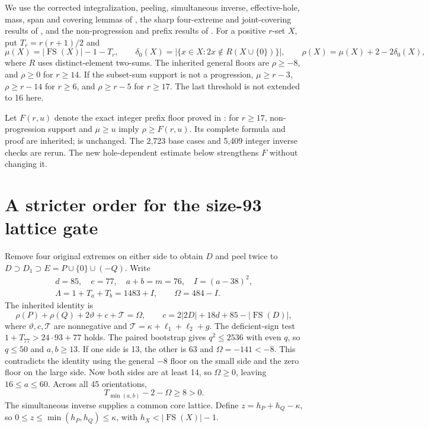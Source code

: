 \documentclass[11pt,a4paper]{article}
\newcommand{\FS}{\operatorname{FS}}
\newcommand{\T}{\mathcal T}
\begin{document}
We use the corrected integralization, peeling, simultaneous inverse,
effective-hole, mass, span and covering lemmas of \cite{foundation},
the sharp four-extreme and joint-covering results of \cite{overlap},
and the non-progression and prefix results of \cite{sharp,previous}.
For a positive $r$-set $X$, put $T_r=r(r+1)/2$ and
\[
 \mu(X)=|\FS(X)|-1-T_r,\qquad
 \delta_0(X)=|\{x\in X:2x\notin R(X\cup\{0\})\}|,\qquad
 \rho(X)=\mu(X)+2-2\delta_0(X),
\]
where $R$ uses distinct-element two-sums. The inherited general floors
are $\rho\ge-8$, and $\rho\ge0$ for $r\ge14$.
If the subset-sum support is not a progression, $\mu\ge r-3$,
$\rho\ge r-14$ for $r\ge6$, and $\rho\ge r-5$ for $r\ge17$.
The last threshold is not extended to 16 here.

Let $F(r,u)$ denote the exact integer prefix floor proved in
\cite{previous}: for $r\ge17$, non-progression support and $\mu\ge u$
imply $\rho\ge F(r,u)$. Its complete formula and proof are inherited;
 is unchanged. The 2,723 base cases
and 5,409 integer inverse checks are rerun. The new hole-dependent
estimate below strengthens $F$ without changing it.

\section{A stricter order for the size-93 lattice gate}
Remove four original extremes on either side to obtain $D$ and peel
twice to $D\supset D_1\supset E=P\cup\{0\}\cup(-Q)$. Write
\begin{gather*}
 d=85,\quad e=77,\quad a+b=m=76,\quad I=(a-38)^2,\\
 \Lambda=1+T_a+T_b=1483+I,\qquad \Omega=484-I.
\end{gather*}
The inherited identity is
\[
 \rho(P)+\rho(Q)+2\vartheta+c+\T=\Omega,
 \qquad c=2|2D|+18d+85-|\FS(D)|,
\]
where $\vartheta,c,\T$ are nonnegative and
$\T=\kappa+\ell_1+\ell_2+g$.
The deficient-sign test $1+T_{77}>24\cdot93+77$ holds.
The paired bootstrap gives $q^2\le2536$ with even $q$, so $q\le50$
and $a,b\ge13$. If one side is 13, the other is 63 and
$\Omega=-141<-8$. This contradicts the identity using the general
$-8$ floor on the small side and the zero floor on the large side.
Now both sides are at least 14, so $\Omega\ge0$, leaving
$16\le a\le60$. Across all 45 orientations,
\[
 T_{\min(a,b)}-2-\Omega\ge8>0.
\]
The simultaneous inverse supplies a common core lattice. Define
$z=h_P+h_Q-\kappa$, so $0\le z\le\min(h_P,h_Q)\le\kappa$, with
$h_X<|\FS(X)|-1$.
\end{document}
